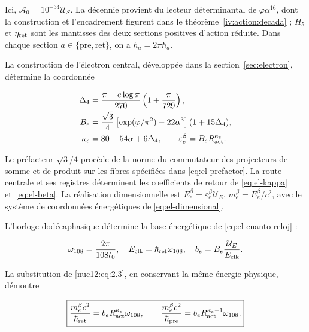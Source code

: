 Ici, \(\mathcal A_0=10^{-34}\mathcal U_S\). La décennie provient du lecteur déterminantal de \(\varphi\alpha^{16}\), dont la construction et l’encadrement figurent dans le théorème~\ref{iv:action:decada} ; \(H_5\) et \(\eta_{\rm ret}\) sont les mantisses des deux sections positives d’action réduite. Dans chaque section \(a\in\{\mathrm{pre},\mathrm{ret}\}\), on a \(h_a=2\pi\hbar_a\).

La construction de l’électron central, développée dans la section~\ref{sec:electron}, détermine la coordonnée




\begin{equation}
\begin{aligned}
\Delta_4&=\frac{\pi-e\log\pi}{270}\left(1+\frac{\pi}{729}\right),\\
B_e&=\frac{\sqrt3}{4}
\left[\exp(\varphi/\pi^2)-22\alpha^3\right](1+15\Delta_4),\\
\kappa_e&=80-54\alpha+6\Delta_4,\qquad
\varepsilon_e^\beta=B_eR_{\rm act}^{\kappa_e}.
\end{aligned}
\label{nuc12:eq:2.3}
\end{equation}



Le préfacteur \(\sqrt3/4\) procède de la norme du commutateur des projecteurs de somme et de produit sur les fibres spécifiées dans \eqref{eq:el-prefactor}. La route centrale et ses registres déterminent les coefficients de retour de \eqref{eq:el-kappa} et~\eqref{eq:el-beta}. La réalisation dimensionnelle est \(E_e^\beta=\varepsilon_e^\beta\mathcal U_E\), \(m_e^\beta=E_e^\beta/c^2\), avec le système de coordonnées énergétiques de \eqref{eq:el-dimensional}.

L’horloge dodécaphasique détermine la base énergétique de \eqref{eq:el-cuanto-reloj} :



\[
\omega_{108}=\frac{2\pi}{108t_0},\quad
E_{\rm clk}=\hbar_{\rm ret}\omega_{108},\quad
b_e=B_e\frac{\mathcal U_E}{E_{\rm clk}}.
\]



La substitution de \eqref{nuc12:eq:2.3}, en conservant la même énergie physique, démontre



\begin{equation}
\boxed{\frac{m_e^\beta c^2}{\hbar_{\rm ret}}
=b_eR_{\rm act}^{\kappa_e}\omega_{108},\qquad
\frac{m_e^\beta c^2}{\hbar_{\rm pre}}
=b_eR_{\rm act}^{\kappa_e-1}\omega_{108}.}
\label{nuc12:eq:2.4}
\end{equation}




